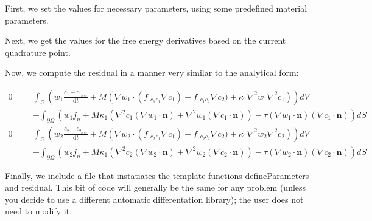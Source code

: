 First, we set the values for necessary parameters, using some predefined material parameters.


\begin{DoxyCodeInclude}

\end{DoxyCodeInclude}


Next, we get the values for the free energy derivatives based on the current quadrature point.


\begin{DoxyCodeInclude}

\end{DoxyCodeInclude}


Now, we compute the residual in a manner very similar to the analytical form\-:

\begin{eqnarray*} 0 &=& \int_\Omega \left(w_1\frac{c_1 - c_{1_{prev}}}{\mathrm{d}t} + M\left(\nabla w_1\cdot(f_{,c_1c_1}\nabla c_1) + f_{,c_1c_2}\nabla c_2) + \kappa_1\nabla^2 w_1\nabla^2 c_1\right)\right) dV\\ &\phantom{=}& - \int_{\partial\Omega} \left(w_1j_n + M\kappa_1\left(\nabla^2c_1(\nabla w_1\cdot\boldsymbol{n}) + \nabla^2w_1(\nabla c_1\cdot\boldsymbol{n})\right) - \tau(\nabla w_1\cdot\boldsymbol{n})(\nabla c_1\cdot\boldsymbol{n})\right) dS\\ 0 &=& \int_\Omega \left(w_2\frac{c_2 - c_{2_{prev}}}{\mathrm{d}t} + M\left(\nabla w_2\cdot(f_{,c_2c_1}\nabla c_1) + f_{,c_2c_2}\nabla c_2) + \kappa_1\nabla^2 w_2\nabla^2 c_2\right)\right) dV\\ &\phantom{=}& - \int_{\partial\Omega} \left(w_2j_n + M\kappa_1\left(\nabla^2c_2(\nabla w_2\cdot\boldsymbol{n}) + \nabla^2w_2(\nabla c_2\cdot\boldsymbol{n})\right) - \tau(\nabla w_2\cdot\boldsymbol{n})(\nabla c_2\cdot\boldsymbol{n})\right) dS \end{eqnarray*}


\begin{DoxyCodeInclude}

\end{DoxyCodeInclude}


Finally, we include a file that instatiates the template functions {\ttfamily define\-Parameters} and {\ttfamily residual}. This bit of code will generally be the same for any problem (unless you decide to use a different automatic differentation library); the user does not need to modify it.


\begin{DoxyCodeInclude}

\end{DoxyCodeInclude}



